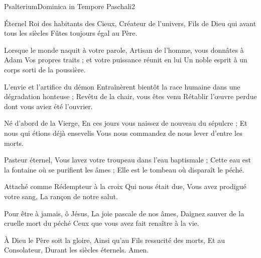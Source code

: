 \documentclass[psautier_nocturne_fr.tex]{subfiles}
\begin{document}
\begin{paracol}{2}
\switchcolumn
\versiculus{}{}
\end{paracol}

\begin{paracol}{2}
\switchcolumn
\versiculus{}{}
\end{paracol}

	{Psalterium}{Dominica in Tempore Paschali}{2}{}{}{}{}{}{}


Éternel Roi des habitants des Cieux,
Créateur de l'univers,
Fils de Dieu qui avant tous les siècles
Fûtes toujours égal au Père.

Lorsque le monde naquit à votre parole,
Artisan de l'homme, vous donnâtes à Adam
Vos propres traits ; et votre puissance réunit en lui
Un noble esprit à un corps sorti de la poussière.

L'envie et l'artifice du démon
Entraînèrent bientôt la race humaine dans une dégradation honteuse ;
Revêtu de la chair, vous êtes venu
Rétablir l'œuvre perdue dont vous aviez été l'ouvrier.

Né d'abord de la Vierge,
En ces jours vous naissez de nouveau du sépulcre ;
Et nous qui étions déjà ensevelis
Vous nous commandez de nous lever d'entre les morts.

Pasteur éternel,
Vous lavez votre troupeau dans l'eau baptismale ;
Cette eau est la fontaine où se purifient les âmes ;
Elle est le tombeau où disparaît le péché.

Attaché comme Rédempteur à la croix
Qui nous était due,
Vous avez prodigué votre sang,
La rançon de notre salut.

Pour être à jamais, ô Jésus,
La joie pascale de nos âmes,
Daignez sauver de la cruelle mort du péché
Ceux que vous avez fait renaître à la vie.

À Dieu le Père soit la gloire,
Ainsi qu'au Fils ressucité des morts,
Et au Consolateur,
Durant les siècles éternels.
Amen.

\end{document}

